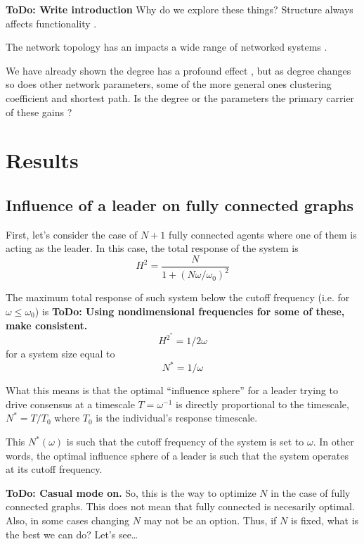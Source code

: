\documentclass[fleqn,10pt]{wlscirep}
\newcommand{\TODO}[1]{{\bf {\color{red} ToDo:} #1}}
\begin{document}
\TODO{Write introduction}
Why do we explore these things? Structure always affects functionality \cite{strogatz2001exploring}.

The network topology has an impacts a wide range of networked systems  \cite{mateo15:_exces}.

We have already shown the degree has a profound effect \cite{mateo2018optimal}, but as degree changes so does other network parameters, some of the more general ones clustering coefficient and shortest path. Is the degree or the parameters the primary carrier of these gains ?


\section*{Results}


\subsection{Influence of a leader on fully connected graphs}

First, let's consider the case of $N+1$ fully connected agents where one of them is acting as the leader.
In this case, the total response of the system is
\begin{equation}
    H^2 = \frac{N}{1 + (N\omega/\omega_0)^2}
\end{equation}

The maximum total response of such system below the cutoff frequency (i.e. for $\omega \le \omega_0$) is \TODO{Using nondimensional frequencies for some of these, make consistent.}
\begin{equation}
    H^{2^*} = 1 / 2\omega
\end{equation}
for a system size equal to
\begin{equation}
    N^* = 1/\omega
\end{equation}

What this means is that the optimal ``influence sphere'' for a leader trying to drive consensus at a timescale $T=\omega^{-1}$ is directly proportional to the timescale, $N^* = T / T_0$ where $T_0$ is the individual's response timescale.

This $N^*(\omega)$ is such that the cutoff frequency of the system is set to $\omega$.
In other words, the optimal influence sphere of a leader is such that the system operates at its cutoff frequency.


\TODO{Casual mode on.} So, this is the way to optimize $N$ in the case of fully connected graphs.
This does not mean that fully connected is necesarily optimal.
Also, in some cases changing $N$ may not be an option.
Thus, if $N$ is fixed, what is the best we can do? Let's see\ldots
\end{document}
